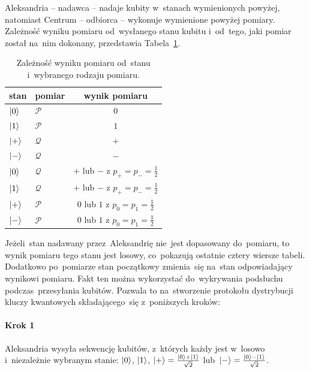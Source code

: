 Aleksandria -- nadawca -- nadaje kubity w~stanach wymienionych powyżej, natomiast Centrum
-- odbiorca -- wykonuje wymienione powyżej pomiary. Zależność wyniku
pomiaru od~wysłanego stanu kubitu i~od~tego, jaki pomiar został na~nim dokonany, przedstawia
Tabela~\ref{tab:bb84}.

\begin{table}[h]
	\begin{center}
		\begin{tabular}{llc}
			stan      & pomiar        & wynik pomiaru                       \\
			\toprule
			$\ket{0}$ & $\mathcal{P}$ & $0$                                 \\
			\midrule
			$\ket{1}$ & $\mathcal{P}$ & $1$                                 \\
			\midrule
			$\ket{+}$ & $\mathcal{Q}$ & $+$                                 \\
			\midrule
			$\ket{-}$ & $\mathcal{Q}$ & $-$                                 \\
			\midrule
			$\ket{0}$ & $\mathcal{Q}$ & $+$ lub $-$ z $p_+=p_-=\frac{1}{2}$ \\
			\midrule
			$\ket{1}$ & $\mathcal{Q}$ & $+$ lub $-$ z $p_+=p_-=\frac{1}{2}$ \\
			\midrule
			$\ket{+}$ & $\mathcal{P}$ & $0$ lub $1$ z $p_0=p_1=\frac{1}{2}$ \\
			\midrule
			$\ket{-}$ & $\mathcal{P}$ & $0$ lub $1$ z $p_0=p_1=\frac{1}{2}$ \\
		\end{tabular}
		\caption{Zależność wyniku pomiaru od~stanu i~wybranego rodzaju pomiaru.}
		\label{tab:bb84}
	\end{center}
\end{table}

Jeżeli~stan nadawany przez~Aleksandrię nie~jest dopasowany do~pomiaru,
to wynik pomiaru tego stanu jest losowy, co~pokazują ostatnie cztery wiersze
tabeli. Dodatkowo po~pomiarze stan początkowy zmienia~się na~stan
odpowiadający wynikowi pomiaru. Fakt ten można wykorzystać do~wykrywania
podsłuchu podczas~przesyłania kubitów. Pozwala to na~stworzenie
protokołu dystrybucji kluczy kwantowych składającego~się z~poniższych
kroków:

\paragraph{Krok 1} Aleksandria wysyła sekwencję kubitów, z~których każdy jest w~losowo
i~niezależnie wybranym stanie: $\ket{0}$, $\ket{1}$,
$\ket{+}=\frac{\ket{0}+\ket{1}}{\sqrt{2}}$ lub~$\ket{-}=\frac{\ket{0}-\ket{1}}{\sqrt{2}}$.
